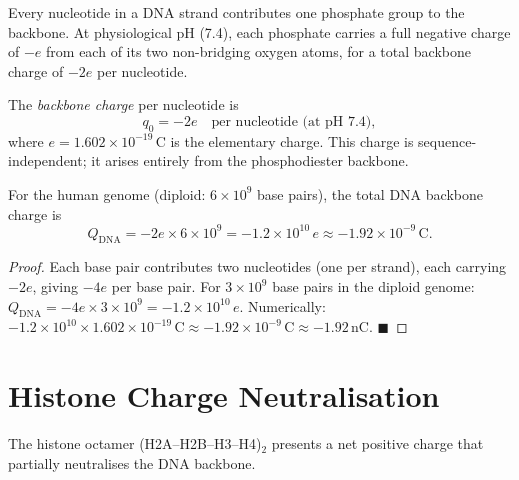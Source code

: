 Every nucleotide in a DNA strand contributes one phosphate group to the
backbone. At physiological pH (7.4), each phosphate carries a full
negative charge of $-e$ from each of its two non-bridging oxygen atoms,
for a total backbone charge of $-2e$ per nucleotide.

\begin{definition}
\label{def:backbone_charge}
The \emph{backbone charge} per nucleotide is
\begin{equation}
  q_0 = -2e \quad \text{per nucleotide (at pH 7.4)},
  \label{eq:q0}
\end{equation}
where $e = 1.602 \times 10^{-19}\,\mathrm{C}$ is the elementary charge.
This charge is sequence-independent; it arises entirely from the
phosphodiester backbone.
\end{definition}

\begin{proposition}
\label{prop:total_charge}
For the human genome (diploid: $6 \times 10^9$ base pairs), the total
DNA backbone charge is
\begin{equation}
  Q_{\mathrm{DNA}} = -2e \times 6 \times 10^9
    = -1.2 \times 10^{10}\,e
    \approx -1.92 \times 10^{-9}\,\mathrm{C}.
  \label{eq:Q_DNA}
\end{equation}
\end{proposition}

\begin{proof}
Each base pair contributes two nucleotides (one per strand), each
carrying $-2e$, giving $-4e$ per base pair. For $3\times 10^9$ base
pairs in the diploid genome: $Q_{\mathrm{DNA}} = -4e \times 3 \times 10^9
= -1.2 \times 10^{10}\,e$.
Numerically: $-1.2 \times 10^{10} \times 1.602 \times 10^{-19}\,\mathrm{C}
\approx -1.92 \times 10^{-9}\,\mathrm{C} \approx -1.92\,\mathrm{nC}$. $\blacksquare$
\end{proof}

\section{Histone Charge Neutralisation}
\label{sec:histone_neutralisation}

The histone octamer (H2A--H2B--H3--H4)$_2$ presents a net positive charge
that partially neutralises the DNA backbone.

